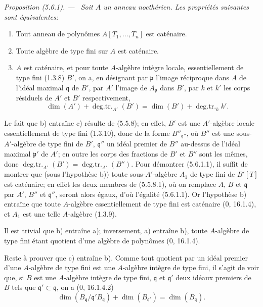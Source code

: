 \documentclass[10pt,oneside]{book}
\makeatletter
\newenvironment{proposition}[1][]{%
  \par\medskip\noindent\itshape Proposition (#1). ---\ }{\par}
\newcommand{\EGAReaderTarget}[2]{\hypertarget{#1}{}\@bsphack\begingroup\def\@currentHref{#1}\label{#2}\endgroup\@esphack}
\makeatother
\begin{document}
\begin{proposition}[5.6.1]
\EGAReaderTarget{ega4.c04.prop.5-6-1}{IV.2.s5.6.1-fr}
Soit $A$ un anneau noethérien. Les propriétés suivantes sont équivalentes:
\begin{enumerate}
\item[a)] Tout anneau de polynômes $A[T_1,\ldots,T_n]$ est caténaire.
\item[b)] Toute algèbre de type fini sur $A$ est caténaire.
\item[c)] $A$ est caténaire, et pour toute $A$-algèbre intègre locale,
essentiellement de type fini (1.3.8) $B'$, on a, en désignant par
$\mathfrak p$ l'image réciproque dans $A$ de l'idéal maximal $\mathfrak q$
de $B'$, par $A'$ l'image de $A_{\mathfrak p}$ dans $B'$, par $k$ et $k'$
les corps résiduels de $A'$ et $B'$ respectivement,
\begin{equation}
\dim(A')+\operatorname{deg.tr.}_{A'}(B')
=\dim(B')+\operatorname{deg.tr.}_k k'.
\tag{5.6.1.1}\label{IV.2.s5.6.1.1-fr}
\end{equation}
\end{enumerate}
\end{proposition}

Le fait que b) entraîne c) résulte de (5.5.8); en effet, $B'$ est une
$A'$-algèbre locale essentiellement de type fini (1.3.10), donc de la forme
$B''_{\mathfrak q''}$, où $B''$ est une sous-$A'$-algèbre de type fini de
$B'$, $\mathfrak q''$ un idéal premier de $B''$ au-dessus de l'idéal maximal
$\mathfrak p'$ de $A'$; en outre les corps des fractions de $B'$ et $B''$
sont les mêmes, donc
$\operatorname{deg.tr.}_{A'}(B')=\operatorname{deg.tr.}_{A'}(B'')$.
Pour démontrer (5.6.1.1), il suffit de montrer que (sous l'hypothèse b)) toute
sous-$A'$-algèbre $A_1$ de type fini de $B'[T]$ est caténaire; en effet les
deux membres de (5.5.8.1), où on remplace $A$, $B$ et $\mathfrak q$ par
$A'$, $B''$ et $\mathfrak q''$, seront alors égaux, d'où l'égalité (5.6.1.1).
Or l'hypothèse b) entraîne que toute $A$-algèbre essentiellement de type fini
est caténaire (0, 16.1.4), et $A_1$ est une telle $A$-algèbre (1.3.9).

Il est trivial que b) entraîne a); inversement, a) entraîne b), toute
$A$-algèbre de type fini étant quotient d'une algèbre de polynômes
(0, 16.1.4).

Reste à prouver que c) entraîne b). Comme tout quotient par un idéal premier
d'une $A$-algèbre de type fini est une $A$-algèbre intègre de type fini, il
s'agit de voir que, si $B$ est une $A$-algèbre intègre de type fini,
$\mathfrak q$ et $\mathfrak q'$ deux idéaux premiers de $B$ tels que
$\mathfrak q'\subset\mathfrak q$, on a (0, 16.1.4.2)
\begin{equation}
\dim(B_{\mathfrak q}/\mathfrak q'B_{\mathfrak q})
+\dim(B_{\mathfrak q'})=\dim(B_{\mathfrak q}).
\tag{5.6.1.2}\label{IV.2.s5.6.1.2-fr}
\end{equation}
\end{document}
